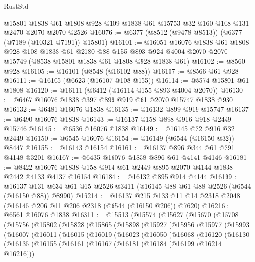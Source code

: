 \begin{lexlean}{RustStd}
\begin{coremodule}
    @15801
    @1838
    @61
    @1808
    @928
    @109
    @1838
    @61
    @15753
    @32
    @160
    @108
    @131
    @2470
    @2070
    @2070
    @2526
@16076 := @6377 (@8512 (@9478 @8513)) (@6377 (@7189 (@10321 @7191)) @15801)
@16101 := @16051
    @16076
    @1838
    @61
    @1808
    @928
    @108
    @1838
    @61
    @2180
    @88
    @155
    @893
    @924
    @4004
    @2070
    @2070
    @15749
    (@8538 @15801 @1838 @61 @1808 @928 @1838 @61)
@16102 := @8560 @928
@16105 := @16101 (@8548 (@16102 @88))
@16107 := @8566 @61 @928
@16111 := @16105 (@6623 (@16107 @108 @155))
@16114 := @8574 @15801 @61 @1808
@16120 := @16111 (@6412 (@16114 @155 @893 @4004 @2070))
@16130 := @6467 @16076 @1838 @397 @899 @919 @61 @2070 @15747 @1838 @930
@16132 := @6481 @16076 @1838
@16135 := @16132 @899 @919 @15747
@16137 := @6490 @16076 @1838
@16143 := @16137 @158 @898 @916 @918 @2449 @15746
@16145 := @6536 @16076 @1838
@16149 := @16145 @32 @916 @32 @2449
@16150 := @6545 @16076
@16154 := @16149 (@6544 (@16150 @32)) @8447
@16155 := @16143 @16154
@16161 := @16137 @896 @344 @61 @391 @4148 @3201
@16167 := @6435 @16076 @1838 @896 @61 @4141 @4146
@16181 := @8422 @16076 @1838 @158 @914 @61 @2449 @895 @2070 @4144 @1838 @2442 @4133 @4137 @16154
@16184 := @16132 @895 @914 @4144
@16199 := @16137 @131 @634 @61 @15 @2526 @3411 (@16145 @88 @61 @88 @2526 (@6544 (@16150 @88)) @8990)
@16214 := @16137
    @215
    @133
    @11
    @14
    @2318
    @2048
    (@16145 @206 @11 @206 @2318 (@6544 (@16150 @206)) @7620)
@16216 := @6561 @16076 @1838
@16311 := @15513
    (@15574
      (@15627
        (@15670
          (@15708
            (@15756
              (@15802
                (@15828
                  (@15865
                    (@15898
                      (@15927
                        (@15956
                          (@15977
                            (@15993
                              (@16007
                                (@16011
                                  (@16015
                                    (@16019
                                      (@16023
                                        (@16050
                                          (@16068
                                            (@16120
                                              (@16130
                                                (@16135
                                                  (@16155
                                                    (@16161
                                                      (@16167
                                                        (@16181
                                                          (@16184 (@16199 (@16214 @16216)))

\end{coremodule}
\end{lexlean}
